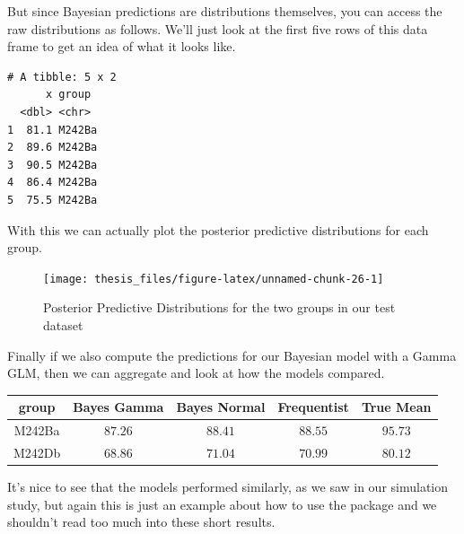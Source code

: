 \documentclass[12pt,twoside]{reedthesis}
\newenvironment{Shaded}{\begin{snugshade}}{\end{snugshade}}
\newcommand{\AttributeTok}[1]{\textcolor[rgb]{0.77,0.63,0.00}{#1}}
\newcommand{\ConstantTok}[1]{\textcolor[rgb]{0.00,0.00,0.00}{#1}}
\newcommand{\DecValTok}[1]{\textcolor[rgb]{0.00,0.00,0.81}{#1}}
\newcommand{\FloatTok}[1]{\textcolor[rgb]{0.00,0.00,0.81}{#1}}
\newcommand{\FunctionTok}[1]{\textcolor[rgb]{0.00,0.00,0.00}{#1}}
\newcommand{\NormalTok}[1]{#1}
\newcommand{\SpecialCharTok}[1]{\textcolor[rgb]{0.00,0.00,0.00}{#1}}
\begin{document}
But since Bayesian predictions are distributions themselves, you can access the raw distributions as follows. We'll just look at the first five rows of this data frame to get an idea of what it looks like.
\begin{Shaded}
\end{Shaded}
\begin{verbatim}
# A tibble: 5 x 2
      x group 
  <dbl> <chr> 
1  81.1 M242Ba
2  89.6 M242Ba
3  90.5 M242Ba
4  86.4 M242Ba
5  75.5 M242Ba
\end{verbatim}
With this we can actually plot the posterior predictive distributions for each group.
\begin{Shaded}
\end{Shaded}
\begin{figure}

{\centering \texttt{[image: thesis\_files/figure-latex/unnamed-chunk-26-1]} 

}

\caption{Posterior Predictive Distributions for the two groups in our test dataset}\label{fig:unnamed-chunk-26}
\end{figure}
Finally if we also compute the predictions for our Bayesian model with a Gamma GLM, then we can aggregate and look at how the models compared.
\begin{longtable}{ccccc}
\toprule
group & Bayes Gamma & Bayes Normal & Frequentist & True Mean \\ 
\midrule
M242Ba & $87.26$ & $88.41$ & $88.55$ & $95.73$ \\ 
M242Db & $68.86$ & $71.04$ & $70.99$ & $80.12$ \\ 
\bottomrule
\end{longtable}
It's nice to see that the models performed similarly, as we saw in our simulation study, but again this is just an example about how to use the package and we shouldn't read too much into these short results.
\end{document}
